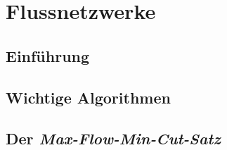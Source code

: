 \chapter{Flussnetzwerke}
\label{ch:flussnetze}

\section{Einführung}

\section{Wichtige Algorithmen}

\section{Der \emph{Max-Flow-Min-Cut-Satz}}
